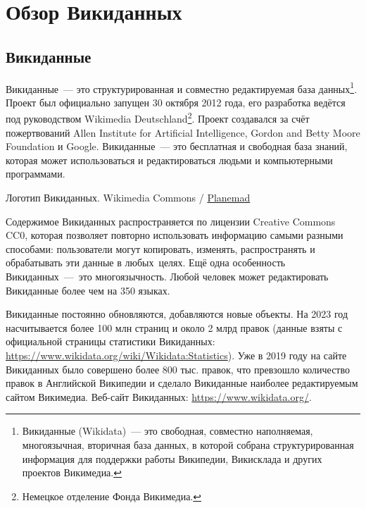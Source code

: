 \chapter{Обзор Викиданных}
\label{ch:ReviewAboutWD}

\section{Викиданные}

Викиданные~--- это структурированная и совместно редактируемая база данных\footnote[][-15pt]{Викиданные (Wikidata)~--- это свободная, совместно наполняемая, многоязычная, вторичная база данных, в которой собрана структурированная информация для поддержки работы Википедии, Викисклада и других проектов Викимедиа.}. Проект был официально запущен 30 октября 2012 года, его разработка ведётся под руководством Wikimedia Deutschland\footnote[][5pt]{Немецкое отделение Фонда Викимедиа.}. Проект создавался за счёт пожертвований Allen Institute for Artificial Intelligence, Gordon and Betty Moore Foundation и Google. Викиданные~--- это бесплатная и свободная база знаний, которая может использоваться и редактироваться людьми и компьютерными программами\autocite{Vrandecic}.\begin{marginfigure}[0.0cm]
{
	\setlength{\fboxsep}{0pt}%
	\setlength{\fboxrule}{1pt}%
}
\caption[Логотип Викиданных]{Логотип Викиданных. 
Wikimedia Commons / \href{https://commons.wikimedia.org/wiki/File:Wikidata-logo-en.svg}{Planemad} 
}
\label{fig:seyu}
\end{marginfigure}

Содержимое Викиданных распространяется по лицензии Creative Commons CC0, которая позволяет повторно использовать информацию самыми разными способами: пользователи могут копировать, изменять, распространять и обрабатывать эти данные в любых целях. Ещё одна особенность Викиданных~--- это многоязычность. Любой человек может редактировать Викиданные более чем на 350 языках.

Викиданные постоянно обновляются, добавляются новые объекты. 
На 2023 год насчитывается более 100 млн страниц и около 2 млрд правок 
(данные взяты с официальной страницы статистики Викиданных: 
\href{https://www.wikidata.org/wiki/Wikidata:Statistics}{https://www.wikidata.org/wiki/Wikidata:Statistics}). 
Уже в 2019 году на сайте Викиданных было совершено более 800 тыс. правок, что превзошло количество правок в Английской Википедии и сделало Викиданные наиболее редактируемым сайтом Викимедиа. %
Веб-сайт Викиданных: \href{https://www.wikidata.org/}{https://www.wikidata.org/}. %




